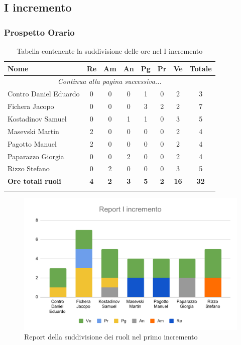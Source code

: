 \documentclass[../piano_di_progetto.tex]{subfiles}
\begin{document}
\subsection{I incremento}%
\label{sub:incremento_1}
\subsubsection{Prospetto Orario}

\begin{center}
	\begin{longtable}{|l|c|c|c|c|c|c|c|}
		\hline
		\rowcolor{lightgray}
		\textbf{Nome} & \textbf{Re} & \textbf{Am} & \textbf{An} & \textbf{Pg}  & \textbf{Pr}   & \textbf{Ve} & \textbf{Totale} \\
		\hline
		\endhead
		
		\hline
		\multicolumn{8}{|c|}{\emph{Continua alla pagina successiva...}}\\
		\hline
		\endfoot

		\endlastfoot
		
		\hline
			Contro Daniel Eduardo & 0 & 0 & 0 & 1 & 0 & 2 & 3\\
			Fichera Jacopo & 0 & 0 & 0 & 3 & 2 & 2 & 7 \\
			Kostadinov Samuel & 0 & 0 & 1 & 1 & 0 & 3 & 5 \\			
			Masevski Martin 	& 2 & 0 & 0 & 0 & 0 & 2 & 4\\
			Pagotto Manuel & 2 & 0 & 0 & 0 & 0 & 2 & 4 \\			
			Paparazzo Giorgia & 0 & 0 & 2 & 0 & 0 & 2 & 4 \\
			Rizzo Stefano & 0 & 2 & 0 & 0 & 0 & 3 & 5\\
			\hline
		\textbf{Ore totali ruoli} & \textbf{4} & \textbf{2} & \textbf{3} & \textbf{5} & \textbf{2} & \textbf{16} & \textbf{32} \\
		\hline	
		\rowcolor{white}
		\caption{Tabella contenente la suddivisione delle ore nel I incremento}
	\end{longtable}
\end{center}
 
\begin{figure}[H]
	\centering
	\includegraphics[width=13cm]{src/img/report/report_1_incremento.pdf}
	\caption{Report della suddivisione dei ruoli nel primo incremento}
\end{figure}
\end{document}
